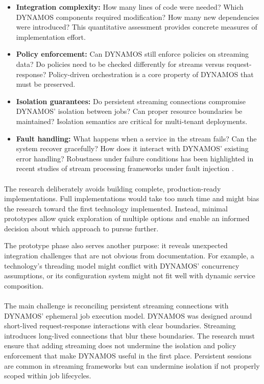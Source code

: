 \documentclass[a4paper,10pt,british]{scrartcl}
\begin{document}
\begin{itemize}
  \item \textbf{Integration complexity:} How many lines of code were needed? Which DYNAMOS components required modification? How many new dependencies were introduced? This quantitative assessment provides concrete measures of implementation effort.
  \item \textbf{Policy enforcement:} Can DYNAMOS still enforce policies on streaming data? Do policies need to be checked differently for streams versus request-response? Policy-driven orchestration is a core property of DYNAMOS that must be preserved.
  \item \textbf{Isolation guarantees:} Do persistent streaming connections compromise DYNAMOS' isolation between jobs? Can proper resource boundaries be maintained? Isolation semantics are critical for multi-tenant deployments.
  \item \textbf{Fault handling:} What happens when a service in the stream fails? Can the system recover gracefully? How does it interact with DYNAMOS' existing error handling? Robustness under failure conditions has been highlighted in recent studies of stream processing frameworks under fault injection \cite{vogel2024faultRecovery}.
\end{itemize}

\paragraph{}

The research deliberately avoids building complete, production-ready implementations. Full implementations would take too much time and might bias the research toward the first technology implemented. Instead, minimal prototypes allow quick exploration of multiple options and enable an informed decision about which approach to pursue further.

The prototype phase also serves another purpose: it reveals unexpected integration challenges that are not obvious from documentation. For example, a technology's threading model might conflict with DYNAMOS' concurrency assumptions, or its configuration system might not fit well with dynamic service composition.

\paragraph{}

The main challenge is reconciling persistent streaming connections with DYNAMOS' ephemeral job execution model. DYNAMOS was designed around short-lived request-response interactions with clear boundaries. Streaming introduces long-lived connections that blur these boundaries. The research must ensure that adding streaming does not undermine the isolation and policy enforcement that make DYNAMOS useful in the first place. Persistent sessions are common in streaming frameworks but can undermine isolation if not properly scoped within job lifecycles.
\end{document}
